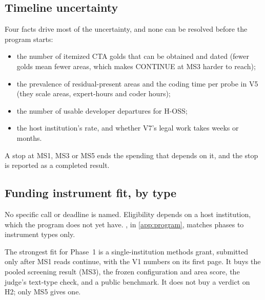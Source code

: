 \subsection{Timeline uncertainty}

\evint{} Four facts drive most of the uncertainty, and none can be resolved before the program
starts:
\begin{itemize}[noitemsep]
  \item the number of itemized CTA golds that can be obtained and dated (fewer golds mean fewer
    areas, which makes CONTINUE at MS3 harder to reach);
  \item the prevalence of residual-present areas and the coding time per probe in V5 (they
    scale areas, expert-hours and coder hours);
  \item the number of usable developer departures for H-OSS;
  \item the host institution's rate, and whether V7's legal work takes weeks or months.
\end{itemize}
A stop at MS1, MS3 or MS5 ends the spending that depends on it, and the stop is reported as a
completed result.

\subsection{Funding instrument fit, by type}

No specific call or deadline is named. Eligibility depends on a host institution, which the
program does not yet have. \evfut{} , in \cref{app:program}, matches
phases to instrument types only.

\evint{} The strongest fit for Phase~1 is a single-institution methods grant, submitted only after
MS1 reads continue, with the V1 numbers on its first page. It buys the pooled screening result
(MS3), the frozen configuration and area score, the judge's text-type check, and a public
benchmark. It does not buy a verdict on H2; only MS5 gives one.
